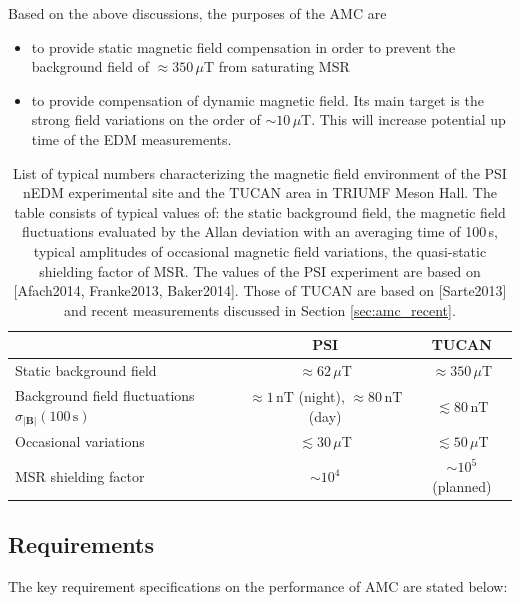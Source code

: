 Based on the above discussions, the purposes of the AMC are 
\begin{itemize}
    \item to provide static magnetic field compensation in order to prevent the background field of $\approx 350\,\mu$T from saturating MSR 
    \item to provide compensation of dynamic magnetic field. Its main target is the strong field variations on the order of $\sim 10\,\mu$T. This will increase potential up time of the EDM measurements. 
\end{itemize}

\begin{table}[hbt]
\centering 
\begin{tabular}{|l||c|c|}
\hline

 & \multicolumn{1}{c|}{\textbf{PSI}} & \multicolumn{1}{c|}{\textbf{TUCAN}} \\ \hline\hline 
Static background field  & $\approx62\,\mu$T & $\approx 350\,\mu$T                       \\ \hline
Background field fluctuations  $\sigma_{|\mathbf{B}|}(100\,\mathrm{s})$ & $\approx 1\,\mathrm{nT}$ (night), $\approx 80\,\mathrm{nT}$ (day) & $\lesssim 80\,\mathrm{nT}$ \\ \hline
Occasional variations    & $\lesssim30\,\mu$T   & $\lesssim 50\,\mu$T            \\ \hline
 MSR shielding  factor       &    $\sim 10^4$   &   $\sim 10^5$ (planned)  \\ \hline 
\end{tabular}
\caption{List of typical numbers characterizing the magnetic field environment of the PSI nEDM experimental site and the TUCAN area in TRIUMF Meson Hall. The table consists of typical values of: the static background field, the magnetic field fluctuations evaluated by the Allan deviation with an averaging time of 100\,s, typical amplitudes of occasional magnetic field variations, the quasi-static shielding factor of MSR. The values of the PSI experiment are based on [Afach2014, Franke2013, Baker2014]. Those of TUCAN are based on [Sarte2013] and recent measurements discussed in Section \ref{sec:amc_recent}. 
}
\label{tab:amc_comparaion}
\end{table}


\subsection{Requirements}
The key requirement specifications on the performance of AMC are stated below:

